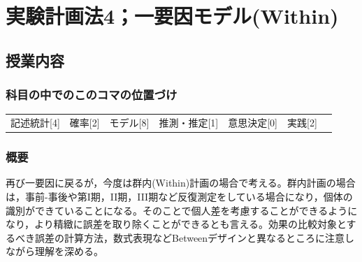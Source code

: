 \section{実験計画法4；一要因モデル(Within)}
\label{lesson14}

\subsection{授業内容}
\subsubsection{科目の中でのこのコマの位置づけ}
\begin{tabular}[t]{ccccccc}
    記述統計[4] & 確率[2] & モデル[8] & 推測・推定[1] & 意思決定[0] & 実践[2]
\end{tabular}
\subsubsection{概要}
再び一要因に戻るが，今度は群内(Within)計画の場合で考える。群内計画の場合は，事前-事後や第I期，II期，III期など反復測定をしている場合になり，個体の識別ができていることになる。そのことで個人差を考慮することができるようになり，より精緻に誤差を取り除くことができるとも言える。効果の比較対象とするべき誤差の計算方法，数式表現などBetweenデザインと異なるところに注意しながら理解を深める。
